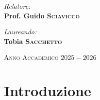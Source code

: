 \documentclass[a4paper, 12pt]{book}
\newcommand{\setupfancy}{
    \pagestyle{fancy}
    \fancyhf{}
    \renewcommand{\headrulewidth}{2pt}
    \fancyhead[EL]{\textbf{\textsf{\nouppercase\thepage}}}
    \fancyhead[ER]{\textbf{\textsf{\nouppercase\leftmark}}}
    \fancyhead[OR]{\textbf{\textsf{\nouppercase\thepage}}}
    \fancyhead[OL]{\textbf{\textsf{\nouppercase{\rightmark}}}}
}
\begin{document}
\begin{titlepage}
\begin{center}
\end{center}
\vspace*{1.5cm}
	\vspace*{15mm}
	\begin{minipage}{0.45\textwidth}
		\begin{flushleft} \Large
			\emph{Relatore:}\\
			\Large \textbf{Prof. Guido \textsc{Sciavicco}}
		\end{flushleft}
	\end{minipage}
	\begin{minipage}{0.45\textwidth}
    
		\begin{flushright} \Large
			\emph{Laureando:} \\
			\Large \textbf{Tobia \textsc{Sacchetto}}
		\end{flushright}
	\end{minipage}
	
	\vspace*{20mm}
	\Large \textsc{Anno Accademico $2025-2026$}
\end{titlepage}
\restoregeometry

\pagestyle{empty}
\clearpage
\tableofcontents
\thispagestyle{empty}

\chapter{Introduzione}

\setupfancy %
\end{document}
